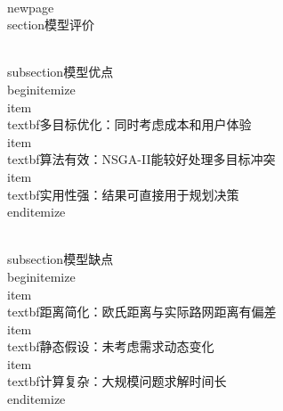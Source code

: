 \\newpage
\\section{模型评价}

\\subsection{模型优点}
\\begin{itemize}
    \\item \\textbf{多目标优化}：同时考虑成本和用户体验
    \\item \\textbf{算法有效}：NSGA-II能较好处理多目标冲突
    \\item \\textbf{实用性强}：结果可直接用于规划决策
\\end{itemize}

\\subsection{模型缺点}
\\begin{itemize}
    \\item \\textbf{距离简化}：欧氏距离与实际路网距离有偏差
    \\item \\textbf{静态假设}：未考虑需求动态变化
    \\item \\textbf{计算复杂}：大规模问题求解时间长
\\end{itemize}
